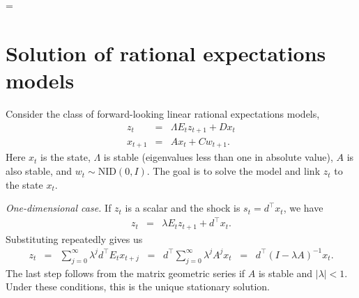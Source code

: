 \documentclass[11pt]{article}
\newcounter{tab}
\begin{document}
{%
%



\pagebreak
\baselineskip=\oldbaselineskip
\appendix
\section{Solution of rational expectations models}
\label{app:hs-formulas}


Consider the class of forward-looking linear rational expectations models,
\begin{eqnarray*}
         z_t     &=& \Lambda E_t z_{t+1} + D x_t \\
        x_{t+1}  &=& A x_t + C w_{t+1} .
\end{eqnarray*}
Here $x_t$ is the state,
$\Lambda$ is stable (eigenvalues less than one in absolute value),
$A$ is also stable,
and  $w_t \sim \mbox{NID}(0,I)$.
The goal is to solve the model and link $z_t$ to the state $x_t$.


{\it One-dimensional case.\/}
If $z_t$ is a scalar and the shock is $s_t = d^\top x_t$, we have
\begin{eqnarray}
    z_t &=&    \lambda E_t z_{t+1} + d^\top x_{t} .
    \label{eq:for-diff-eq-scalar}
\end{eqnarray}
Substituting repeatedly gives us
\begin{eqnarray*}
    z_t &=&  \sum_{j=0}^\infty \lambda^j  d^\top E_t x_{t+j}
        \;\;=\;\;  d^\top \sum_{j=0}^\infty \lambda^j  A^j x_{t}
        \;\;=\;\;  d^\top (I-\lambda A)^{-1} x_t.
\end{eqnarray*}
The last step follows from the matrix geometric series if $A$ is stable and $|\lambda|<1$.
Under these conditions, this is the unique stationary solution.


}
\end{document}
